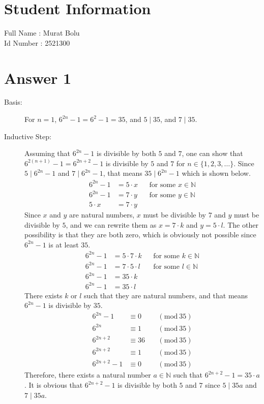 \documentclass[12pt]{article}
\newcommand{\divides}{\mid}
\newcommand{\Mod}[1]{\ (\mathrm{mod}\ #1)}
\newcommand{\+}{\mkern2mu}
\begin{document}
\section*{Student Information }
Full Name : Murat Bolu \\
Id Number : 2521300 \\

\section*{Answer 1}

\begin{description}
    \item[Basis:] For $n = 1$, $6^{2n} - 1 = 6^2 - 1 = 35$, and $5 \divides 35$, and $7 \divides 35$.
    \item[Inductive Step:] Assuming that $6^{2n} - 1$ is divisible by both $5$ and $7$, one can show that $6^{2(n+1)} - 1 = 6^{2n+2} - 1$ is divisible by $5$ and $7$ for $n \in \{1, 2, 3, \dotsc\}$. Since $5 \divides 6^{2n} - 1$ and $7 \divides 6^{2n} - 1$, that means $35 \divides 6^{2n} - 1$ which is shown below.
    \begin{align*}
        6^{2n} - 1 &= 5 \cdot x && \text{for some $x \in \mathbb{N}$} \\
        6^{2n} - 1 &= 7 \cdot y && \text{for some $y \in \mathbb{N}$} \\
        5 \cdot x &= 7 \cdot y
    \end{align*}
    Since $x$ and $y$ are natural numbers, $x$ must be divisible by $7$ and $y$ must be divisible by $5$, and we can rewrite them as $x = 7 \cdot k$ and $y = 5 \cdot l$. The other possibility is that they are both zero, which is obviously not possible since $6^{2n} - 1$ is at least $35$.
    \begin{align*}
        6^{2n} - 1 &= 5 \cdot 7 \cdot k && \text{for some $k \in \mathbb{N}$} \\
        6^{2n} - 1 &= 7 \cdot 5 \cdot l && \text{for some $l \in \mathbb{N}$} \\
        6^{2n} - 1 &= 35 \cdot k \\
        6^{2n} - 1 &= 35 \cdot l
    \end{align*}
    There exists $k$ or $l$ such that they are natural numbers, and that means $6^{2n} - 1$ is divisible by $35$.
    \begin{align*}
        6^{2n} - 1 &\equiv 0 && \Mod{35} \\
        6^{2n} &\equiv 1 && \Mod{35} \\
        6^{2n+2} &\equiv 36 && \Mod{35} \\
        6^{2n+2} &\equiv 1 && \Mod{35} \\
        6^{2n+2} - 1 & \equiv 0 && \Mod{35}
    \end{align*}
    Therefore, there exists a natural number $a \in \mathbb{N}$ such that $6^{2n+2} - 1 = 35 \cdot a$. It is obvious that $6^{2n+2} - 1$ is divisible by both $5$ and $7$ since $5 \divides 35a$ and $7 \divides 35a$.


\end{description}
\end{document}
